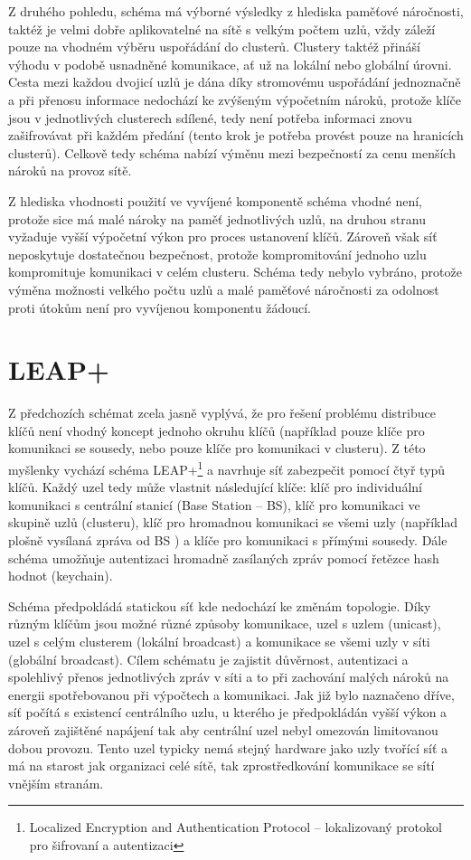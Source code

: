 \documentclass[11pt,final,twoside]{fithesis2}
\begin{document}
Z druhého pohledu, schéma má výborné výsledky z hlediska paměťové náročnosti, taktéž je velmi dobře aplikovatelné na sítě s velkým
počtem uzlů, vždy záleží pouze na vhodném výběru uspořádání do clusterů. Clustery taktéž přináší výhodu v podobě usnadněné komunikace, ať 
už na lokální nebo globální úrovni. Cesta mezi každou dvojicí uzlů je dána díky stromovému uspořádání jednoznačně a při přenosu informace 
nedochází ke zvýšeným výpočetním nároků, protože klíče jsou v jednotlivých clusterech sdílené, tedy není potřeba informaci znovu 
zašifrovávat při každém předání (tento krok je potřeba provést pouze na hranicích clusterů). Celkově tedy schéma nabízí výměnu mezi 
bezpečností za cenu menších nároků na provoz sítě. 

Z hlediska vhodnosti použití ve vyvíjené komponentě schéma vhodné není, protože sice má malé nároky na paměť jednotlivých uzlů, na druhou 
stranu vyžaduje vyšší výpočetní výkon pro proces ustanovení klíčů. Zároveň však síť neposkytuje dostatečnou bezpečnost, protože 
kompromitování jednoho uzlu kompromituje komunikaci v celém clusteru. Schéma tedy nebylo vybráno, protože výměna možnosti velkého počtu
uzlů a malé paměťové náročnosti za odolnost proti útokům není pro vyvíjenou komponentu žádoucí. 

\section{LEAP+} \label{sec:leap}
Z předchozích schémat zcela jasně vyplývá, že pro řešení problému distribuce klíčů není vhodný koncept jednoho okruhu klíčů (například pouze klíče pro komunikaci se sousedy, nebo pouze
klíče pro komunikaci v clusteru). Z této myšlenky vychází schéma LEAP+\footnote{Localized Encryption and Authentication Protocol -- lokalizovaný protokol pro šifrovaní a autentizaci} \cite{Zhu2006} 
a navrhuje síť zabezpečit pomocí čtyř typů klíčů. Každý uzel tedy může vlastnit následující klíče: klíč pro individuální komunikaci s centrální stanicí (Base Station -- BS), klíč pro komunikaci 
ve skupině uzlů (clusteru), klíč pro hromadnou komunikaci se všemi uzly (například plošně vysílaná zpráva od BS ) a klíče pro komunikaci s přímými sousedy. Dále schéma umožňuje autentizaci hromadně 
zasílaných zpráv pomocí řetězce hash hodnot (keychain). 

Schéma předpokládá statickou síť kde nedochází ke změnám topologie. Díky různým klíčům jsou možné různé způsoby komunikace, uzel s uzlem (unicast), uzel s celým clusterem (lokální broadcast) 
a komunikace se všemi uzly v síti (globální broadcast). Cílem schématu je zajistit důvěrnost, autentizaci a spolehlivý přenos jednotlivých zpráv v síti a to při zachování malých nároků
na energii spotřebovanou při výpočtech a komunikaci. Jak již bylo naznačeno dříve, síť počítá s existencí centrálního uzlu, u kterého je předpokládán vyšší výkon a zároveň zajištěné napájení tak 
aby centrální uzel nebyl omezován limitovanou dobou provozu. Tento uzel typicky nemá stejný hardware jako uzly tvořící síť a má na starost jak organizaci celé sítě, tak zprostředkování komunikace se 
sítí vnějším stranám.  
\end{document}
